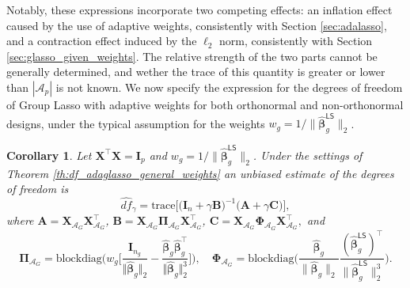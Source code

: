 \documentclass[a4paper, 12pt]{article}
\newcommand{\Aset}{\mathcal{A}}
\newcommand{\betahat}{\widehat{\boldsymbol\beta}}
\newcommand{\trace}{\mathrm{trace}}
\newcommand{\T}{\top}
\def\bbeta{\boldsymbol{\beta}}
\def\bPi{\boldsymbol{\Pi}}
\def\bPhi{\boldsymbol{\Phi}}
\def\bA{\mathbf{A}}
\def\bB{\mathbf{B}}
\def\bC{\mathbf{C}}
\def\bI{\mathbf{I}}
\def\bX{\mathbf{X}}
\newtheorem{corollary}{Corollary}
\begin{document}
%
\noindent Notably, these expressions incorporate two competing effects: an inflation effect caused by the use of adaptive weights, consistently with Section \ref{sec:adalasso},  and a contraction effect induced by the $\ell_2$ norm, consistently with Section \ref{sec:glasso_given_weights}. The relative strength of the two parts cannot be generally determined, and wether the trace of this quantity is greater or lower than $|\Aset_p|$ is not known.
%
We now specify the expression for the degrees of freedom of Group Lasso with adaptive weights for both orthonormal and non-orthonormal designs, under the typical assumption for the  weights $w_g = 1/\lVert \widehat{\bbeta}^{\mathsf{LS}}_g \rVert_2$.
%
\begin{corollary}
\label{th:df_adaglasso_ortho}
    Let $\bX^{\T}\bX=\bI_p$ and $w_g = 1/\lVert \widehat{\bbeta}_g^{\mathsf{LS}}\rVert_2$. Under the settings of Theorem \ref{th:df_adaglasso_general_weights} an unbiased estimate of the degrees of freedom is
\begin{equation}
\label{eq:dof_adaglasso_ortho}
\widehat{df}_\gamma = \trace \big[ \big(\bI_n+\gamma \bB \big)^{-1} \big(\bA + \gamma\bC \big) \big],
\end{equation}
where $\bA = \bX_{\Aset_G}\bX_{\Aset_G}^{\T}$, $\bB =\bX_{\Aset_G}\bPi_{\Aset_G}\bX_{\Aset_G}^{\T}$, $\bC =  \bX_{\Aset_G} \bPhi_{\Aset_G} \bX_{\Aset_G}^{\T},$ and
\begin{equation*}
    \bPi_{\Aset_G} = \mathrm{blockdiag}\bigg(w_g\bigg[\frac{\bI_{n_g}}{\Vert\betahat_g\Vert_2}-\frac{\betahat_g\betahat_g^{\T}}{\Vert\betahat_g\Vert_2^3}\bigg]\bigg),\quad \bPhi_{\Aset_G} = \mathrm{blockdiag} \bigg( \frac{\widehat{\bbeta}_g}{\lVert \widehat{\bbeta}_g \rVert_2}\frac{(\widehat{\bbeta}_{g}^{\mathsf{LS}})^{\T}}{\lVert \widehat{\bbeta}_{g}^{\mathsf{LS}}\rVert_2^3} \bigg).
\end{equation*}
\end{corollary}
\end{document}
